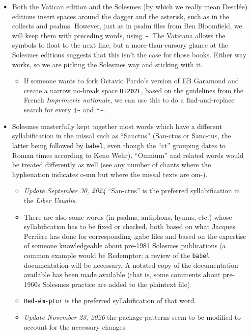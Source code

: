 \documentclass[11pt]{article}
\begin{document}
\begin{itemize}
\begin{itemize}
 The psalm files from Ben Bloomfield do not have an extra, manually-inserted space, and we aim to keep it that way.
\item
We will let \LaTeX{}\ (well, \verb|babel|) do its thing with other double punctuation marks: no other intervention should be needed. This also saves quite a bit of space on the page (unfortunately at a premium): this is the best compromise between American/Anglo and French usage.
\end{itemize}
\item
Both the Vatican edition and the Solesmes (by which we really mean Desclée) editions insert spaces around the dagger and the asterisk, such as in the collects and psalms. However, just as in psalm files from Ben Bloomfield, we will keep them with preceding words, using \verb|~|. The Vaticana allows the symbols to float to the next line, but  a more-than-cursory glance at the Solesmes editions suggests that this isn't the case for those books. Either way works, so we are picking the Solesmes way and sticking with it.
 \begin{itemize}
\item
If someone wants to fork Octavio Pardo's version of EB Garamond and create a narrow no-break space \verb|U+202F|, based on the guidelines from the French \textit{Imprimerie nationale,} we can use this to do a find-and-replace search for every \verb|†~| and \verb|*~|.
\end{itemize}
\item
Solesmes masterfully kept together most words which have a different syllabification in the missal such as ``Sanctus'' (San-ctus or Sanc-tus, the latter being followed by \verb|babel|, even though the ``ct'' grouping dates to Roman times according to Keno Wehr). ``Omnium'' and related words would be treated differently as well (see any number of chants where the hyphenation indicates o-mn but where the missal texts are om-).
 \begin{itemize}
 \item
\emph{Update September 30, 2024} ``San-ctus'' is the preferred syllabification in the \textit{Liber Usualis.} 

\item
There are also some words (in psalms, antiphons, hymns, etc.) whose syllabification has to be fixed or checked, both based on what Jacques Perrière has done for corresponding .gabc files and based on the expertise of someone knowledgeable about pre-1981 Solesmes publications (a common example would be Redemptor; a review of the \verb|babel| documentation will be necessary. A notated copy of the documentation available has been made available (that is, some comments about pre-1960s Solesmes practice are added to the plaintext file).
 \item
\verb|Red-ém-ptor| is the preferred syllabification of that word.
\item \emph{Update November 23, 2026} the package patterns seem to be modified to account for the necessary changes
\end{itemize}


\end{itemize}
\end{document}
